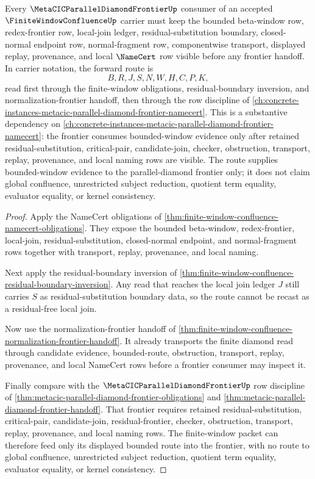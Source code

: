 \begin{theorem}
\label{thm:finite-window-confluence-metacic-frontier-forward-route}
Every $\MetaCICParallelDiamondFrontierUp$ consumer of an accepted $\FiniteWindowConfluenceUp$ carrier must keep the bounded beta-window row, redex-frontier row, local-join ledger, residual-substitution boundary, closed-normal endpoint row, normal-fragment row, componentwise transport, displayed replay, provenance, and local $\NameCert$ row visible before any frontier handoff. In carrier notation, the forward route is
$$
B,R,J,S,N,W,H,C,P,K ,
$$
read first through the finite-window obligations, residual-boundary inversion, and normalization-frontier handoff, then through the row discipline of \autoref{ch:concrete-instances-metacic-parallel-diamond-frontier-namecert}. This is a substantive dependency on \autoref{ch:concrete-instances-metacic-parallel-diamond-frontier-namecert}: the frontier consumes bounded-window evidence only after retained residual-substitution, critical-pair, candidate-join, checker, obstruction, transport, replay, provenance, and local naming rows are visible. The route supplies bounded-window evidence to the parallel-diamond frontier only; it does not claim global confluence, unrestricted subject reduction, quotient term equality, evaluator equality, or kernel consistency.
\end{theorem}
\begin{proof}
Apply the NameCert obligations of \autoref{thm:finite-window-confluence-namecert-obligations}. They expose the bounded beta-window, redex-frontier, local-join, residual-substitution, closed-normal endpoint, and normal-fragment rows together with transport, replay, provenance, and local naming.

Next apply the residual-boundary inversion of \autoref{thm:finite-window-confluence-residual-boundary-inversion}. Any read that reaches the local join ledger $J$ still carries $S$ as residual-substitution boundary data, so the route cannot be recast as a residual-free local join.

Now use the normalization-frontier handoff of \autoref{thm:finite-window-confluence-normalization-frontier-handoff}. It already transports the finite diamond read through candidate evidence, bounded-route, obstruction, transport, replay, provenance, and local NameCert rows before a frontier consumer may inspect it.

Finally compare with the $\MetaCICParallelDiamondFrontierUp$ row discipline of \autoref{thm:metacic-parallel-diamond-frontier-obligations} and \autoref{thm:metacic-parallel-diamond-frontier-handoff}. That frontier requires retained residual-substitution, critical-pair, candidate-join, residual-frontier, checker, obstruction, transport, replay, provenance, and local naming rows. The finite-window packet can therefore feed only its displayed bounded route into the frontier, with no route to global confluence, unrestricted subject reduction, quotient term equality, evaluator equality, or kernel consistency.
\end{proof}

